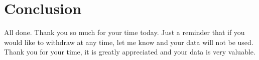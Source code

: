\documentclass[a4 paper, 12pt]{article}
\begin{document}
\section*{Conclusion}
    \begin{itshape}
        All done. Thank you so much for your time today. Just a reminder that if you would like to withdraw at any time, let me know and your data will not be used. Thank you for your time, it is greatly appreciated and your data is very valuable.
    \end{itshape}
\end{document}
